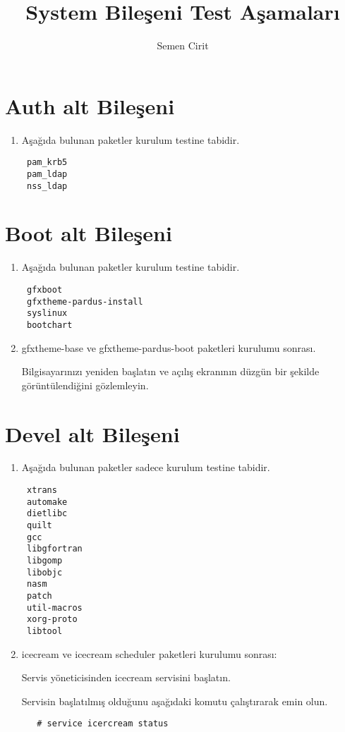 \documentclass[a4paper,10pt]{article}
\title{System Bileşeni Test Aşamaları}
\author{Semen Cirit}
\begin{document}
\maketitle
\section{Auth alt Bileşeni}
\begin{enumerate}
  \item Aşağıda bulunan paketler kurulum testine tabidir.
\begin{verbatim}
 pam_krb5
 pam_ldap
 nss_ldap
\end{verbatim}

\end{enumerate}

\section{Boot alt Bileşeni}
\begin{enumerate}
 \item Aşağıda bulunan paketler kurulum testine tabidir.
\begin{verbatim}
 gfxboot
 gfxtheme-pardus-install
 syslinux
 bootchart
\end{verbatim}

\item gfxtheme-base ve gfxtheme-pardus-boot paketleri kurulumu sonrası.

Bilgisayarınızı yeniden başlatın ve açılış ekranının düzgün bir şekilde görüntülendiğini gözlemleyin.
\end{enumerate}

\section{Devel alt Bileşeni}
\begin{enumerate}
 \item Aşağıda bulunan paketler sadece kurulum testine tabidir.
\begin{verbatim}
 xtrans
 automake
 dietlibc 
 quilt
 gcc
 libgfortran
 libgomp
 libobjc
 nasm
 patch
 util-macros
 xorg-proto
 libtool
\end{verbatim}
 \item icecream ve icecream scheduler paketleri kurulumu sonrası:

Servis yöneticisinden icecream servisini başlatın.

Servisin başlatılmış olduğunu aşağıdaki komutu çalıştırarak emin olun.
 \begin{verbatim}
   # service icercream status
 \end{verbatim}

\end{enumerate}
\end{document}
